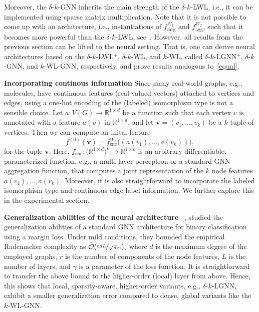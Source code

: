\documentclass{article}
\newcommand{\xhdr}[1]{{\noindent\bfseries #1}}
\theoremstyle{definition}
\newcommand{\cO}{\ensuremath{{\mathcal O}}\xspace}
\newcommand{\bbR}{\ensuremath{\mathbb{R}}}
\newcommand{\RR}{\mathbb{R}}
\renewcommand{\vec}[1]{\mathbf{#1}}
\newcommand{\kwl}{$k$-\textsf{WL}\xspace}
\newcommand{\deltakwl}{$\delta$-$k$-\textsf{WL}\xspace}
\newcommand{\localkwl}{$\delta$-$k$-\textsf{LWL}\xspace}
\newcommand{\pluskwl}{$\delta$-$k$-\textsf{LWL}$^+$\xspace}
\newcommand{\deltakwln}{$\delta$-$k$-\textsf{GNN}\xspace}
\newcommand{\localkwln}{$\delta$-$k$-\textsf{LGNN}\xspace}
\newcommand{\kwln}{$k$-\textsf{WL-GNN}\xspace}
\begin{document}
Moreover, the \deltakwln inherits the main strength of the \localkwl, i.e., it can be implemented using sparse matrix multiplication. Note that it is not possible to come up with an architecture, i.e., instantiations of $f^{W_1}_{\text{mrg}}$ and  $f^{W_2}_{\text{agg}}$, such that it becomes more powerful than the \localkwl, see~\cite{Mor+2019}. However, all results from the previous section can be lifted to the neural setting. That is, one can derive neural architectures based on the \pluskwl, \deltakwl, and \kwl, called \localkwln\hspace{-3pt}$^+$, \deltakwln, and \kwln, respectively, and prove results analogous to~\cref{equal}.

\xhdr{Incorporating continous information}\label{contfeat}
Since many real-world graphs, e.g., molecules, have continuous features (real-valued vectors) attached to vertices and edges, using a one-hot encoding of the (labeled) isomorphism type is not a sensible choice. Let $a \colon V(G) \rightarrow \RR^{1\times d}$ be a function such that each vertex $v$ is annotated with a feature $a(v)$ in $\bbR^{1\times d}$, and let $\vec{v} = (v_1, \dots, v_k)$ be a $k$-tuple of vertices. Then we can compute an inital feature
\begin{equation}\label{encode}
f^{(0)}(\vec{v}) = f^{W_3}_{\text{enc}}\big( (a(v_1), \dots, a(v_k)) \big),
\end{equation}
for the tuple $\vec{v}$. Here, $f_{\text{enc}} \colon \big(\RR^{1\times d}\big)^k \to \RR^{1\times e}$ is an arbitrary differentiable, parameterized function, e.g., a multi-layer perceptron or a standard GNN aggregation function, that computes a joint representation of the $k$ node features $a(v_1), \dots, a(v_k)$. Moreover, it is also straightforward to incorporate the labeled isomorphism type and continuous edge label information. We further explore this in the experimental section.


\xhdr{Generalization abilities of the  neural architecture}
\citeauthor{Gar+2020}~\cite{Gar+2020}, studied the generalization abilities of a standard GNN architecture for binary classification using a margin loss. Under mild conditions, they bounded the empirical Rademacher complexity as
$\tilde{\cO}\! \left( \nicefrac{rdL}{\sqrt{m}\gamma} \right)\!,$
where $d$ is the maximum degree of the employed graphs, $r$ is the number of components of the node features, $L$ is the number of layers, and $\gamma$ is a parameter of the loss function. It is straightforward to transfer the above bound to the higher-order (local) layer from above. Hence, this shows that local, sparsity-aware, higher-order variants, e.g., \localkwln, exhibit a smaller generalization error compared to dense, global variants like the \kwln.
\end{document}
